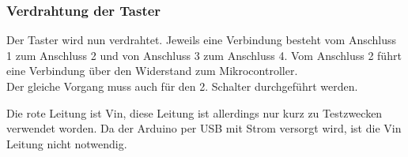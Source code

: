 \subsubsection{Verdrahtung der Taster}
\begin{figwindow}
Der Taster wird nun verdrahtet. Jeweils eine Verbindung besteht vom Anschluss 1 zum Anschluss 2 und von Anschluss 3 zum Anschluss 4. Vom Anschluss 2 führt eine Verbindung über den Widerstand zum Mikrocontroller.\\

Der gleiche Vorgang muss auch für den 2. Schalter durchgeführt werden.

\end{figwindow}
\vspace{40mm}
Die rote Leitung ist Vin, diese Leitung ist allerdings nur kurz zu Testzwecken verwendet worden. Da der Arduino per USB mit Strom versorgt wird, ist die Vin Leitung nicht notwendig.

